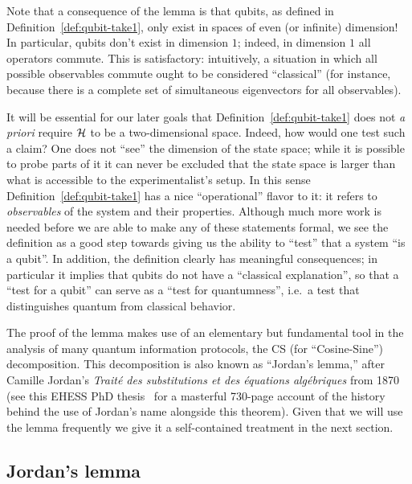 Note that a consequence of the lemma is that qubits, as defined in Definition~\ref{def:qubit-take1}, only exist in spaces of even (or infinite) dimension! In particular, qubits don't exist in dimension $1$; indeed, in dimension $1$ all operators commute. This is satisfactory: intuitively, a situation in which all possible observables commute ought to be considered ``classical'' (for instance, because there is a complete set of simultaneous eigenvectors for all observables). 

It will be essential for our later goals that Definition~\ref{def:qubit-take1} does not \emph{a priori} require $\mathcal{H}$ to be a two-dimensional space. Indeed, how would one test such a claim? One does not ``see'' the dimension of the state space; while it is possible to probe parts of it it can never be excluded that the state space is larger than what is accessible to the experimentalist's setup. In this sense Definition~\ref{def:qubit-take1} has a nice ``operational'' flavor to it: it refers to \emph{observables} of the system and their properties.  Although much more work is needed before we are able to make any of these statements formal, we see the definition as a good step towards giving us the ability to ``test'' that a system ``is a qubit''. In addition, the definition clearly has meaningful consequences; in particular it implies that qubits do not have a ``classical explanation'', so that a ``test for a qubit'' can serve as a ``test for quantumness'', i.e.\ a test that distinguishes quantum from classical behavior. 

The proof of the lemma makes use of an elementary but fundamental tool in the analysis of many quantum information protocols, the CS (for ``Cosine-Sine'') decomposition. This decomposition is also known as ``Jordan's lemma,'' after Camille Jordan's \emph{Traité des substitutions et des équations algébriques} from 1870 (see this EHESS PhD thesis~\cite{brechenmacher2006histoire} for a masterful 730-page account of the history behind the use of Jordan's name alongside this theorem). Given that we will use the lemma frequently we give it a self-contained treatment in the next section. 

\subsection{Jordan's lemma}

